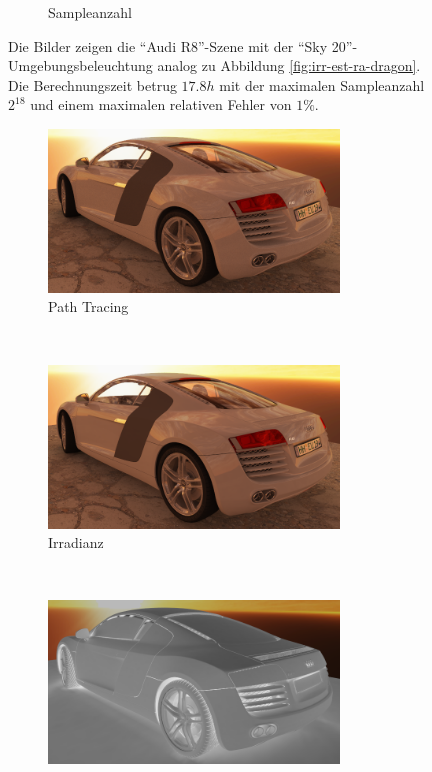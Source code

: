 \begin{figure}[h]
\begin{subfigure}[t]{\textwidth}
			\caption{Sampleanzahl}
		\end{subfigure}
		\caption[Vertex Lighting anhand der \enquote{Audi R8}-Szene mit \enquote{Sky 20}-HDR]{Die Bilder zeigen die \enquote{Audi R8}-Szene mit der \enquote{Sky 20}-Umgebungsbeleuchtung analog zu Abbildung \ref{fig:irr-est-ra-dragon}. Die Berechnungszeit betrug $17.8\unit{h}$ mit der maximalen Sampleanzahl $2^{18}$ und einem maximalen relativen Fehler von $1\unit{\%}$.}
		\label{fig:irr-est-ra-audi}
	\end{figure}

	\begin{figure}[h]
		\begin{subfigure}[t]{\textwidth}
			\center
			\includegraphics[width=0.85\textwidth]{pic/irr_est-ra-r8_2-ref.png}
			\caption{Path Tracing}
		\end{subfigure}
		\medskip \\
		\begin{subfigure}[t]{\textwidth}
			\center
			\includegraphics[width=0.85\textwidth]{pic/irr_est-ra-r8_2-irr.png}
			\caption{Irradianz}
		\end{subfigure}
		\medskip \\
		\begin{subfigure}[t]{\textwidth}
			\center
			\includegraphics[width=0.85\textwidth]{pic/irr_est-ra-r8_2-scount.png}

\end{subfigure}
\end{figure}
